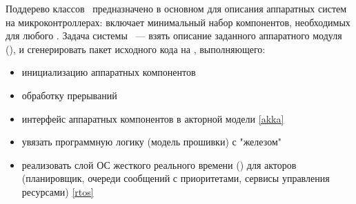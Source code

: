 \clearpage
{}\label{hw}\secdown



\noindent
Поддерево классов \ предназначено в основном для описания аппаратных систем на микроконтроллерах:
включает минимальный набор компонентов, необходимых для любого  \iot. Задача системы
\met\ --- взять описание заданного аппаратного модуля (), и сгенерировать
пакет исходного кода на \ci, выполняющего:
\begin{itemize}
    \item инициализацию аппаратных компонентов
    \item обработку прерываний
    \item интерфейс аппаратных компонентов в акторной модели \ref{akka}
    \item увязать программную логику (модель прошивки) с "железом"
    \item реализовать слой ОС жесткого реального времени () для акторов
          (планировщик, очереди сообщений с приоритетами, сервисы управления ресурсами) \ref{rtos}
\end{itemize}

\secup
